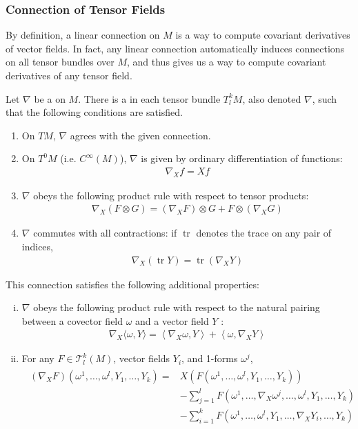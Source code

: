 \documentclass[12pt]{article} %
\begin{document}
\subsubsection{Connection of Tensor Fields}
By definition, a linear connection on $M$ is a way to compute covariant derivatives of vector fields. In fact, any linear connection automatically induces connections on all tensor bundles over $M$, and thus gives us a way to compute covariant derivatives of any tensor field.
\begin{lema}
Let $\nabla$ be a  on $M$. There is a  in each tensor bundle $T_{l}^{k} M$, also denoted $\nabla$, such that the following conditions are satisfied.
\begin{enumerate}
    \item On $TM$, $\nabla$ agrees with the given connection.
    \item On $T^{0} M$ (i.e. $C^\infty(M)$), $\nabla$ is given by ordinary differentiation of functions:
\begin{align*}
\nabla_{X} f=X f
\end{align*}
\item $\nabla$ obeys the following product rule with respect to tensor products:
\begin{align*}
\nabla_{X}(F \otimes G)=\left(\nabla_{X} F\right) \otimes G+F \otimes\left(\nabla_{X} G\right)
\end{align*}
\item $\nabla$ commutes with all contractions: if $\operatorname{tr}$ denotes the trace on any pair of indices,
\begin{align*}
\nabla_{X}(\operatorname{tr} Y)=\operatorname{tr}\left(\nabla_{X} Y\right)
\end{align*}
\end{enumerate}
This connection satisfies the following additional properties:
\begin{enumerate}[(i)]
    \item $\nabla$ obeys the following product rule with respect to the natural pairing between a covector field $\omega$ and a vector field $Y$ :
\begin{align*}
\nabla_{X}\langle\omega, Y\rangle=\left\langle\nabla_{X} \omega, Y\right\rangle+\left\langle\omega, \nabla_{X} Y\right\rangle
\end{align*}
    \item For any $F \in \mathcal{T}_{l}^{k}(M)$, vector fields $Y_{i}$, and 1-forms $\omega^{j}$,
\begin{align*}
\begin{aligned}
\left(\nabla_{X} F\right)\left(\omega^{1}, \ldots, \omega^{l}, Y_{1}, \ldots, Y_{k}\right)=&X\left(F\left(\omega^{1}, \ldots, \omega^{l}, Y_{1}, \ldots, Y_{k}\right)\right) \\
&-\sum_{j=1}^{l} F\left(\omega^{1}, \ldots, \nabla_{X} \omega^{j}, \ldots, \omega^{l}, Y_{1}, \ldots, Y_{k}\right) \\
&-\sum_{i=1}^{k} F\left(\omega^{1}, \ldots, \omega^{l}, Y_{1}, \ldots, \nabla_{X} Y_{i}, \ldots, Y_{k}\right)
\end{aligned}
\end{align*}
\end{enumerate}
\end{lema} 
\end{document}
